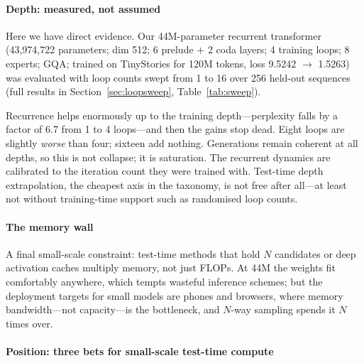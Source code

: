\paragraph{Depth: measured, not assumed}

Here we have direct evidence. Our 44M-parameter recurrent transformer
(43,974,722 parameters; dim 512; 6 prelude $+$ 2 coda layers; 4 training
loops; 8 experts; GQA; trained on TinyStories for 120M tokens, loss
9.5242 $\rightarrow$ 1.5263) was evaluated with loop counts swept from 1
to 16 over 256 held-out sequences (full results in
Section~\ref{sec:loopsweep}, Table~\ref{tab:sweep}).

Recurrence helps enormously up to the training depth---perplexity falls
by a factor of 6.7 from 1 to 4 loops---and then the gains stop dead.
Eight loops are slightly \emph{worse} than four; sixteen add nothing.
Generations remain coherent at all depths, so this is not collapse; it
is saturation. The recurrent dynamics are calibrated to the iteration
count they were trained with. Test-time depth extrapolation, the
cheapest axis in the taxonomy, is not free after all---at least not
without training-time support such as randomised loop counts.

\paragraph{The memory wall}

A final small-scale constraint: test-time methods that hold $N$
candidates or deep activation caches multiply memory, not just FLOPs.
At 44M the weights fit comfortably anywhere, which tempts wasteful
inference schemes; but the deployment targets for small models are
phones and browsers, where memory bandwidth---not capacity---is the
bottleneck, and $N$-way sampling spends it $N$ times over.

\paragraph{Position: three bets for small-scale test-time compute}

